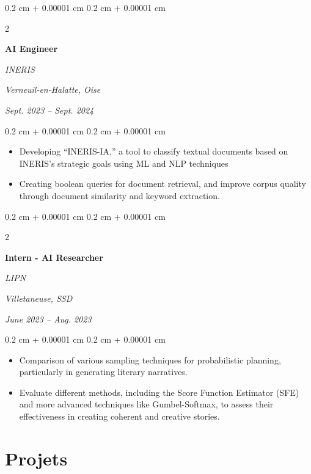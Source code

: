 \documentclass[10pt, letterpaper]{article}
\newenvironment{highlights}{
    \begin{itemize}[
        topsep=0.10 cm,
        parsep=0.10 cm,
        partopsep=0pt,
        itemsep=0pt,
        leftmargin=0.4 cm + 10pt
    ]
}{
    \end{itemize}
} %
\newenvironment{onecolentry}{
    \begin{adjustwidth}{
        0.2 cm + 0.00001 cm
    }{
        0.2 cm + 0.00001 cm
    }
}{
    \end{adjustwidth}
} %
\newenvironment{twocolentry}[2][]{
    \onecolentry
    \def\secondColumn{#2}
    \setcolumnwidth{\fill, 4.5 cm}
    \begin{paracol}{2}
}{
    \switchcolumn \raggedleft \secondColumn
    \end{paracol}
    \endonecolentry
} %
\begin{document}
        \begin{twocolentry}{
            \textit{Verneuil-en-Halatte, Oise}    
                
            \textit{Sept. 2023 – Sept. 2024}}
                \textbf{AI Engineer}
                
                \textit{INERIS}
        \end{twocolentry} 
        \vspace{0.10 cm}
        \begin{onecolentry}
            \begin{highlights}
                \item Developing “INERIS-IA,” a tool to classify textual documents based on INERIS’s strategic goals using ML and NLP techniques
                \item Creating boolean queries for document retrieval, and improve corpus quality through document similarity and keyword extraction.
            \end{highlights}
        \end{onecolentry}
        \vspace{0.2 cm}


        \begin{twocolentry}{
            \textit{Villetaneuse, SSD}    
                
            \textit{June 2023 – Aug. 2023}}
                \textbf{Intern - AI Researcher}
                
                \textit{LIPN}
        \end{twocolentry}    
        \vspace{0.10 cm}
        \begin{onecolentry}
            \begin{highlights}
                \item Comparison of various sampling techniques for probabilistic planning, particularly in generating literary narratives.
                \item Evaluate different methods, including the Score Function Estimator (SFE) and more advanced techniques like Gumbel-Softmax, to assess their effectiveness in creating coherent and creative stories.
            \end{highlights}
        \end{onecolentry}

        \section{Projets}
\end{document}
